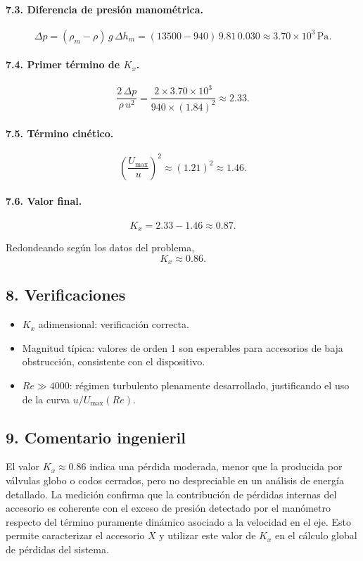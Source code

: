 \documentclass[12pt, a4paper]{article}
\begin{document}
\paragraph{7.3. Diferencia de presión manométrica.}

\[
\Delta p = (\rho_m-\rho)\,g\,\Delta h_m
= (13500-940)\,9.81\,0.030
\approx 3.70\times 10^{3}\,\text{Pa}.
\]

\paragraph{7.4. Primer término de $K_x$.}

\[
\frac{2\,\Delta p}{\rho\,u^2}
=
\frac{2\times 3.70\times 10^{3}}
     {940\times (1.84)^2}
\approx 2.33.
\]

\paragraph{7.5. Término cinético.}

\[
\left(\frac{U_{\max}}{u}\right)^2 
\approx (1.21)^2
\approx 1.46.
\]

\paragraph{7.6. Valor final.}

\[
K_x = 2.33 - 1.46 \approx 0.87.
\]

Redondeando según los datos del problema,
\[
\boxed{K_x \approx 0.86}.
\]


\subsection*{8. Verificaciones}

\begin{itemize}
  \item $K_x$ adimensional: verificación correcta.
  \item Magnitud típica: valores de orden 1 son esperables para accesorios de baja obstrucción, consistente con el dispositivo.
  \item $Re\gg 4000$: régimen turbulento plenamente desarrollado, justificando el uso de la curva $u/U_{\max}(Re)$.
\end{itemize}


\subsection*{9. Comentario ingenieril}

El valor $K_x\approx 0.86$ indica una pérdida moderada, menor que la producida por válvulas globo o codos cerrados, pero no despreciable en un análisis de energía detallado. La medición confirma que la contribución de pérdidas internas del accesorio es coherente con el exceso de presión detectado por el manómetro respecto del término puramente dinámico asociado a la velocidad en el eje. Esto permite caracterizar el accesorio $X$ y utilizar este valor de $K_x$ en el cálculo global de pérdidas del sistema.
\end{document}
